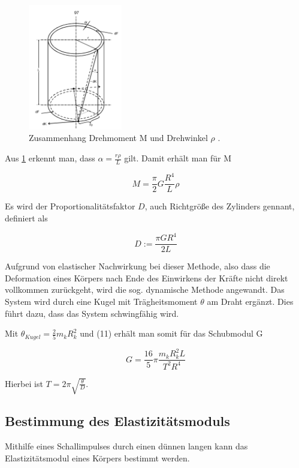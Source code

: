 \begin{figure}[h]
  \centering
  \includegraphics[height=5.5cm]{Grafiken/Herleitung.pdf}
  \caption{Zusammenhang Drehmoment M und Drehwinkel $\rho$ \cite{1}.}
  \label{fig:Herleitung}
\end{figure}


Aus \ref{fig:Herleitung} erkennt man, dass $\alpha = \frac{r\rho}{L}$ gilt. Damit erhält man für M

\begin{equation}
	M = \frac{\pi}{2}G\frac{R^4}{L}\rho
\end{equation} 

Es wird der Proportionalitätsfaktor $D$, auch Richtgröße des Zylinders gennant, definiert als

\begin{equation}
	D := \frac{\pi G R^4}{2L}
\end{equation}


Aufgrund von elastischer Nachwirkung bei dieser Methode, also dass die Deformation eines Körpers nach Ende des Einwirkens der Kräfte nicht direkt vollkommen zurückgeht, wird die sog. dynamische Methode angewandt. Das System wird durch eine Kugel mit Trägheitsmoment $\theta$ am Draht ergänzt. Dies führt dazu, dass das System schwingfähig wird.

Mit $\theta_{Kugel} = \frac{2}{5}m_k R_k^2$ und (11) erhält man somit für das Schubmodul G

\begin{equation}
	G = \frac{16}{5}\pi \frac{m_k R_k^2 L}{T^2 R^4}
\end{equation}

Hierbei ist $T = 2\pi \sqrt{\frac{\theta}{D}}$.

\subsection{Bestimmung des Elastizitätsmoduls}

Mithilfe eines Schallimpulses durch einen dünnen langen kann das Elastizitätsmodul eines Körpers bestimmt werden.


